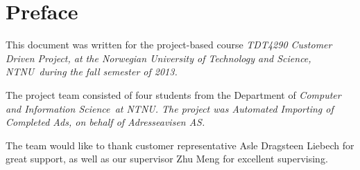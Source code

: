 \section{Preface}
This document was written for the project-based course \em TDT4290 Customer Driven Project\em, at the \em Norwegian University of Technology and Science, NTNU\em \ during the fall semester of 2013.

The project team consisted of four students from the Department of \em Computer and Information Science\em \ at \em NTNU\em. The project was \em Automated Importing of Completed Ads\em, on behalf of \em Adresseavisen AS\em.

The team would like to thank customer representative Asle Dragsteen Liebech for great support, as well as our supervisor Zhu Meng for excellent supervising.